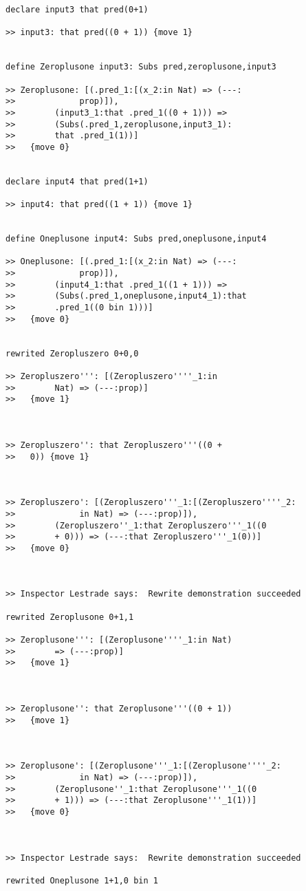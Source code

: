 \documentclass{article}
\begin{document}
\begin{verbatim}
declare input3 that pred(0+1)

>> input3: that pred((0 + 1)) {move 1}


define Zeroplusone input3: Subs pred,zeroplusone,input3

>> Zeroplusone: [(.pred_1:[(x_2:in Nat) => (---:
>>             prop)]),
>>        (input3_1:that .pred_1((0 + 1))) => 
>>        (Subs(.pred_1,zeroplusone,input3_1):
>>        that .pred_1(1))]
>>   {move 0}


declare input4 that pred(1+1)

>> input4: that pred((1 + 1)) {move 1}


define Oneplusone input4: Subs pred,oneplusone,input4

>> Oneplusone: [(.pred_1:[(x_2:in Nat) => (---:
>>             prop)]),
>>        (input4_1:that .pred_1((1 + 1))) => 
>>        (Subs(.pred_1,oneplusone,input4_1):that 
>>        .pred_1((0 bin 1)))]
>>   {move 0}


rewrited Zeropluszero 0+0,0

>> Zeropluszero''': [(Zeropluszero''''_1:in 
>>        Nat) => (---:prop)]
>>   {move 1}



>> Zeropluszero'': that Zeropluszero'''((0 + 
>>   0)) {move 1}



>> Zeropluszero': [(Zeropluszero'''_1:[(Zeropluszero''''_2:
>>             in Nat) => (---:prop)]),
>>        (Zeropluszero''_1:that Zeropluszero'''_1((0 
>>        + 0))) => (---:that Zeropluszero'''_1(0))]
>>   {move 0}



>> Inspector Lestrade says:  Rewrite demonstration succeeded

rewrited Zeroplusone 0+1,1

>> Zeroplusone''': [(Zeroplusone''''_1:in Nat) 
>>        => (---:prop)]
>>   {move 1}



>> Zeroplusone'': that Zeroplusone'''((0 + 1)) 
>>   {move 1}



>> Zeroplusone': [(Zeroplusone'''_1:[(Zeroplusone''''_2:
>>             in Nat) => (---:prop)]),
>>        (Zeroplusone''_1:that Zeroplusone'''_1((0 
>>        + 1))) => (---:that Zeroplusone'''_1(1))]
>>   {move 0}



>> Inspector Lestrade says:  Rewrite demonstration succeeded

rewrited Oneplusone 1+1,0 bin 1


\end{verbatim}
\end{document}
